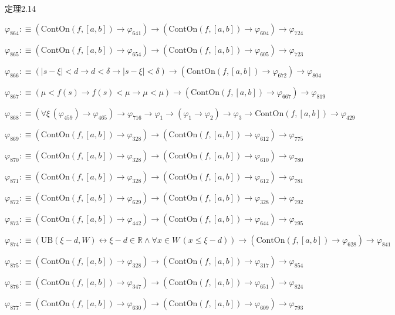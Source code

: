 \begin{fullproof}{定理2.14}
\begin{abbrevlist}
\item $\varphi_{864} :\equiv (\mathrm{ContOn}(f,[a,b]) \to \varphi_{641}) \to (\mathrm{ContOn}(f,[a,b]) \to \varphi_{604}) \to \varphi_{724}$
\item $\varphi_{865} :\equiv (\mathrm{ContOn}(f,[a,b]) \to \varphi_{654}) \to (\mathrm{ContOn}(f,[a,b]) \to \varphi_{605}) \to \varphi_{723}$
\item $\varphi_{866} :\equiv (\lvert s - \xi \rvert < d \to d < \delta \to \lvert s - \xi \rvert < \delta) \to (\mathrm{ContOn}(f,[a,b]) \to \varphi_{672}) \to \varphi_{804}$
\item $\varphi_{867} :\equiv (\mu < f(s) \to f(s) < \mu \to \mu < \mu) \to (\mathrm{ContOn}(f,[a,b]) \to \varphi_{667}) \to \varphi_{819}$
\item $\varphi_{868} :\equiv (\forall \xi\,(\varphi_{459}) \to \varphi_{465}) \to \varphi_{716} \to \varphi_{1} \to (\varphi_{1} \to \varphi_{2}) \to \varphi_{3} \to \mathrm{ContOn}(f,[a,b]) \to \varphi_{429}$
\item $\varphi_{869} :\equiv (\mathrm{ContOn}(f,[a,b]) \to \varphi_{328}) \to (\mathrm{ContOn}(f,[a,b]) \to \varphi_{612}) \to \varphi_{775}$
\item $\varphi_{870} :\equiv (\mathrm{ContOn}(f,[a,b]) \to \varphi_{328}) \to (\mathrm{ContOn}(f,[a,b]) \to \varphi_{610}) \to \varphi_{780}$
\item $\varphi_{871} :\equiv (\mathrm{ContOn}(f,[a,b]) \to \varphi_{328}) \to (\mathrm{ContOn}(f,[a,b]) \to \varphi_{612}) \to \varphi_{781}$
\item $\varphi_{872} :\equiv (\mathrm{ContOn}(f,[a,b]) \to \varphi_{629}) \to (\mathrm{ContOn}(f,[a,b]) \to \varphi_{328}) \to \varphi_{792}$
\item $\varphi_{873} :\equiv (\mathrm{ContOn}(f,[a,b]) \to \varphi_{442}) \to (\mathrm{ContOn}(f,[a,b]) \to \varphi_{644}) \to \varphi_{795}$
\item $\varphi_{874} :\equiv (\mathrm{UB}(\xi - d,W) \leftrightarrow \xi - d \in \mathbb{R} \land \forall x \in W\,(x \leq \xi - d)) \to (\mathrm{ContOn}(f,[a,b]) \to \varphi_{628}) \to \varphi_{841}$
\item $\varphi_{875} :\equiv (\mathrm{ContOn}(f,[a,b]) \to \varphi_{328}) \to (\mathrm{ContOn}(f,[a,b]) \to \varphi_{317}) \to \varphi_{854}$
\item $\varphi_{876} :\equiv (\mathrm{ContOn}(f,[a,b]) \to \varphi_{347}) \to (\mathrm{ContOn}(f,[a,b]) \to \varphi_{651}) \to \varphi_{824}$
\item $\varphi_{877} :\equiv (\mathrm{ContOn}(f,[a,b]) \to \varphi_{630}) \to (\mathrm{ContOn}(f,[a,b]) \to \varphi_{609}) \to \varphi_{793}$

\end{abbrevlist}
\end{fullproof}
